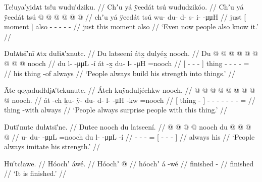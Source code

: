 \ex\label{ex:93-70-even-now-people-know-it}%
%
\begingl
	\glpreamble	Tc!uya′ỵidᴀt ts!u wudu′dziku. //
	\glpreamble	Chʼu yá ÿeedát tsú wududzikóo. //
	\gla	Chʼu {} yá ÿeedát {} tsú
		 @ {} @ {} @ {} @ {} @ {} @ {} //
	\glb	chʼu {} yá ÿeedát {} tsú
		wu- du- d- s- i-  -μμH //
	\glc	just {}[  moment {}] also
		- - - -  - //
	\gld	just {} this moment {} also
		 {} {} {} {} {} {} //
	\glft	‘Even now people also know it.’
		//
\endgl
\xe

\ex\label{ex:93-71-make-his-strength-things}%
%
\begingl
	\glpreamble	Dułᴀtsī′nī ᴀtx dułiᴀ′xnutc. //
	\glpreamble	Du latseení átx̱ dulyéx̱ nooch. //
	\gla	{} Du  @ {} @ {} @ {} @ {} {}
		{}  @ {} {}
		 @ {} @ {} @ {} @ \•nooch //
	\glb	{} du l-  -μμL {} -í {}
		{} át -x̱ {}
		du- l-  -μH =nooch //
	\glc	{}[  -  - \· - {}]
		{} thing - {}
		- -  - = //
	\gld	{} his  {} {} {} {} {}
		{} thing -of {}
		 {} {} {} \•always //
	\glft	‘People always build his strength into things.’
		//
\endgl
\xe

\ex\label{ex:93-71-make-his-strength-things}%
%
\begingl
	\glpreamble	Ātc qoỵadudłdjᴀ′tckunutc. //
	\glpreamble	Átch ḵuÿaduljéchkw nooch. //
	\gla	{}  @ {} {}
		 @ {} @ {} @ {} @ {} @ {} @ {} @ {} @ \•nooch. //
	\glb	{} át -ch {}
		ḵu- ÿ- du- d- l-  -μH -kw =nooch //
	\glc	{}[ thing - {}]
		- - - - -  - - = //
	\gld	{} thing -with {}
		 {} {} {} {} {} {} {} \•always //
	\glft	‘People always surprise people with this thing.’
		//
\endgl
\xe

\ex\label{ex:93-72-imitate-his-strength}%
%
\begingl
	\glpreamble	Dutī′nutc dułᴀtsī′ne. //
	\glpreamble	Dutee nooch du latseení. //
	\gla	{} @ {} @ {} @ {} @ \•nooch
		{} du  @ {} @ {} @ {} @ {} {} //
	\glb	u- du-  -μμL =nooch
		{} du l-  -μμL {} -í {}  //
	\glc	{}- -  - =
			{}[  -  - \· - {}] //
	\gld	{} {} {} {} \•always
		{} his  {} {} {} {} {} //
	\glft	‘People always imitate his strength.’
		//
\endgl
\xe

\ex\label{ex:93-73-thats-it}%
%
\begingl
	\glpreamble	Hū′tc!awe. //
	\glpreamble	Hóochʼ áwé. //
	\gla	Hóochʼ  @ {} //
	\glb	hóochʼ á -wé //
	\glc	finished  - //
	\gld	finished  {} //
	\glft	‘It is finished.’
		//
\endgl
\xe
